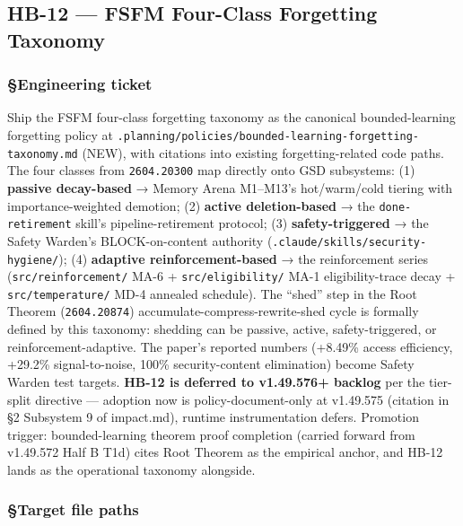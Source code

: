 \documentclass[11pt,letterpaper]{article}
\newcommand{\arxivid}[1]{\texttt{\textcolor{accent}{#1}}}
\begin{document}
\subsection{HB-12 — FSFM Four-Class Forgetting Taxonomy}
\subsubsection{§Engineering ticket}

Ship the FSFM four-class forgetting taxonomy as the canonical
bounded-learning forgetting policy at
\texttt{.planning/policies/bounded-learning-forgetting-taxonomy.md}
(NEW), with citations into existing forgetting-related code paths. The
four classes from \arxivid{2604.20300} map directly onto GSD subsystems:
(1) \textbf{passive decay-based} → Memory Arena M1--M13's hot/warm/cold
tiering with importance-weighted demotion; (2) \textbf{active
deletion-based} → the \texttt{done-retirement} skill's
pipeline-retirement protocol; (3) \textbf{safety-triggered} → the Safety
Warden's BLOCK-on-content authority
(\texttt{.claude/skills/security-hygiene/}); (4) \textbf{adaptive
reinforcement-based} → the reinforcement series
(\texttt{src/reinforcement/} MA-6 + \texttt{src/eligibility/} MA-1
eligibility-trace decay + \texttt{src/temperature/} MD-4 annealed
schedule). The ``shed'' step in the Root Theorem (\arxivid{2604.20874})
accumulate-compress-rewrite-shed cycle is formally defined by this
taxonomy: shedding can be passive, active, safety-triggered, or
reinforcement-adaptive. The paper's reported numbers (+8.49\% access
efficiency, +29.2\% signal-to-noise, 100\% security-content elimination)
become Safety Warden test targets. \textbf{HB-12 is deferred to
v1.49.576+ backlog} per the tier-split directive --- adoption now is
policy-document-only at v1.49.575 (citation in §2 Subsystem 9 of
impact.md), runtime instrumentation defers. Promotion trigger:
bounded-learning theorem proof completion (carried forward from
v1.49.572 Half B T1d) cites Root Theorem as the empirical anchor, and
HB-12 lands as the operational taxonomy alongside.

\subsubsection{§Target file paths}
\end{document}
